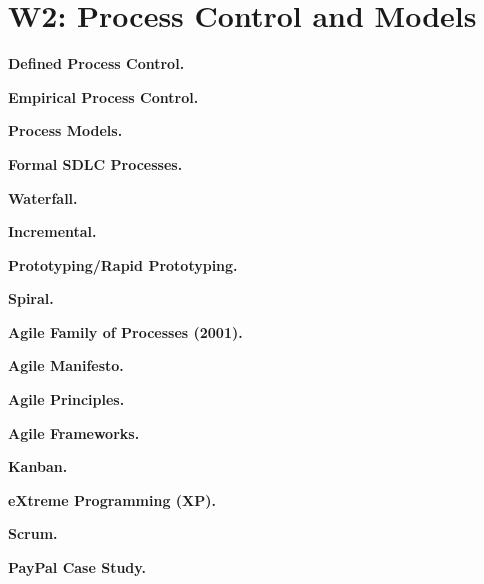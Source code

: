 \section{W2: Process Control and Models}

\textbf{Defined Process Control.}

\textbf{Empirical Process Control.}

\textbf{Process Models.}

\textbf{Formal SDLC Processes.}

    \textbf{Waterfall.}

    \textbf{Incremental.}

    \textbf{Prototyping/Rapid Prototyping.}

    \textbf{Spiral.}

\textbf{Agile Family of Processes (2001).}

    \textbf{Agile Manifesto.}

    \textbf{Agile Principles.}

    \textbf{Agile Frameworks.}

        \textbf{Kanban.}

        \textbf{eXtreme Programming (XP).}

        \textbf{Scrum.}

        \textbf{PayPal Case Study.}
